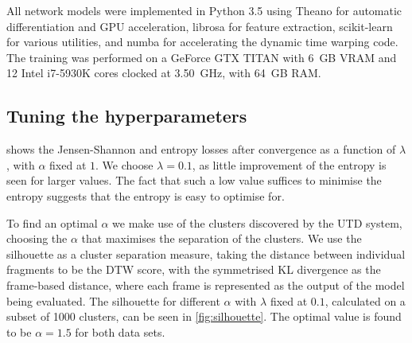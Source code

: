 All network models were implemented in Python 3.5 using Theano \parencite{theano} for automatic differentiation and GPU acceleration, librosa \parencite{librosa} for feature extraction, scikit-learn \parencite{scikit-learn} for various utilities, and numba \parencite{numba} for accelerating the dynamic time warping code.
The training was performed on a GeForce GTX TITAN with 6~GB VRAM and 12 Intel i7-5930K cores clocked at 3.50~GHz, with 64~GB RAM.

\subsection{Tuning the hyperparameters}
\label{sec:hypersearch}

 shows the Jensen-Shannon and entropy losses after convergence as a function of $\lambda$, with $\alpha$ fixed at $1$.
We choose $\lambda = 0.1$, as little improvement of the entropy is seen for larger values.
The fact that such a low value suffices to minimise the entropy suggests that the entropy is easy to optimise for.

To find an optimal $\alpha$ we make use of the clusters discovered by the UTD system, choosing the $\alpha$ that maximises the separation of the clusters.
We use the silhouette \parencite{rousseeuw1987silhouettes} as a cluster separation measure, taking the distance between individual fragments to be the DTW score, with the symmetrised KL divergence as the frame-based distance, where each frame is represented as the output of the model being evaluated.
The silhouette for different $\alpha$ with $\lambda$ fixed at $0.1$, calculated on a subset of 1000 clusters, can be seen in \cref{fig:silhouette}.
The optimal value is found to be $\alpha = 1.5$ for both data sets.


